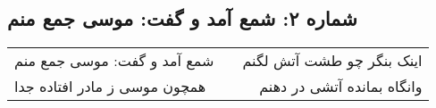 \begin{center}
\section*{شماره ۲: شمع آمد و گفت: موسی جمع منم}
\label{sec:002}
\begin{longtable}{l p{0.5cm} r}
شمع آمد و گفت: موسی جمع منم
&&
اینک بنگر چو طشت آتش لگنم
\\
همچون موسی ز مادر افتاده جدا
&&
وانگاه بمانده آتشی در دهنم
\\
\end{longtable}
\end{center}
